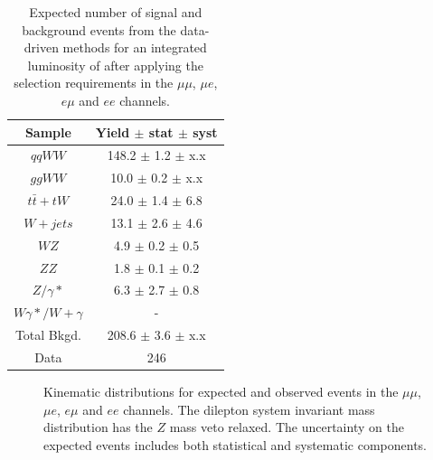 \begin{table}[ht!]
  \begin{center}
  \begin{tabular} {|c|c|}
\hline
Sample                & Yield $\pm$ stat $\pm$ syst \\ \hline \hline
$qqWW$                & 148.2 $\pm$  1.2 $\pm$ x.x  \\ \hline
$ggWW$                & 10.0 $\pm$  0.2 $\pm$ x.x  \\ \hline
$t\bar{t} + tW$       & 24.0 $\pm$  1.4 $\pm$ 6.8  \\ \hline
$W+jets$              & 13.1 $\pm$  2.6 $\pm$ 4.6  \\ \hline
$WZ$                  & 4.9 $\pm$  0.2 $\pm$ 0.5  \\ \hline
$ZZ$                  & 1.8 $\pm$  0.1 $\pm$  0.2  \\ \hline
$Z/\gamma*$           & 6.3 $\pm$  2.7 $\pm$  0.8  \\ \hline
$W\gamma*/W+\gamma$   & -    \\ \hline \hline
Total Bkgd.           & 208.6 $\pm$  3.6 $\pm$ x.x  \\ \hline \hline
Data                  & 246 \\ \hline
\end{tabular}
  \caption{Expected number of signal and background events from the data-driven methods for
  an integrated luminosity of \intlumiEightTeV after applying the selection requirements 
in the $\mu\mu$, $\mu{e}$, $e\mu$ and $ee$  channels.}
   \label{tab:data_yields}
  \end{center}
\end{table}

\begin{figure}[!hbtp]
\begin{center}
\caption{Kinematic distributions for expected and observed events in the  $\mu\mu$, $\mu{e}$, $e\mu$ and $ee$ channels.
The dilepton system invariant mass distribution has the $Z$ mass veto relaxed.
The uncertainty on the expected events includes both statistical and systematic components.}
\label{fig:inclplots}
\end{center}
\end{figure}


